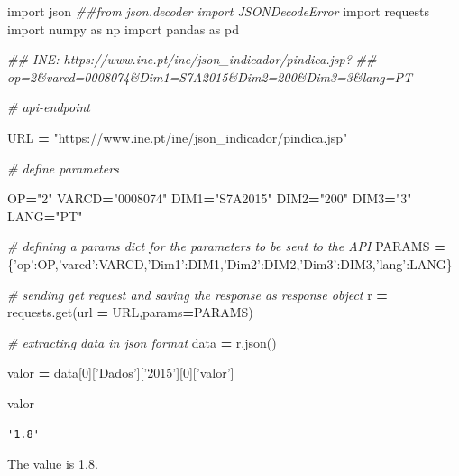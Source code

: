 \documentclass[
  12pt,
]{article}
\newenvironment{Shaded}{\begin{snugshade}}{\end{snugshade}}
\newcommand{\CommentTok}[1]{\textcolor[rgb]{0.56,0.35,0.01}{\textit{#1}}}
\newcommand{\DecValTok}[1]{\textcolor[rgb]{0.00,0.00,0.81}{#1}}
\newcommand{\ImportTok}[1]{#1}
\newcommand{\NormalTok}[1]{#1}
\newcommand{\OperatorTok}[1]{\textcolor[rgb]{0.81,0.36,0.00}{\textbf{#1}}}
\newcommand{\StringTok}[1]{\textcolor[rgb]{0.31,0.60,0.02}{#1}}
\begin{document}
\begin{Shaded}
\begin{Highlighting}[]
\ImportTok{import}\NormalTok{ json}
\CommentTok{##from json.decoder import JSONDecodeError}
\ImportTok{import}\NormalTok{ requests}
\ImportTok{import}\NormalTok{ numpy }\ImportTok{as}\NormalTok{ np}
\ImportTok{import}\NormalTok{ pandas }\ImportTok{as}\NormalTok{ pd}

\CommentTok{## INE: https://www.ine.pt/ine/json_indicador/pindica.jsp?}
\CommentTok{## op=2&varcd=0008074&Dim1=S7A2015&Dim2=200&Dim3=3&lang=PT}

\CommentTok{# api-endpoint }

\NormalTok{URL }\OperatorTok{=} \StringTok{"https://www.ine.pt/ine/json_indicador/pindica.jsp"}
  
\CommentTok{# define parameters}

\NormalTok{OP}\OperatorTok{=}\StringTok{"2"}
\NormalTok{VARCD}\OperatorTok{=}\StringTok{"0008074"}
\NormalTok{DIM1}\OperatorTok{=}\StringTok{"S7A2015"}
\NormalTok{DIM2}\OperatorTok{=}\StringTok{"200"}
\NormalTok{DIM3}\OperatorTok{=}\StringTok{"3"}
\NormalTok{LANG}\OperatorTok{=}\StringTok{"PT"}


\CommentTok{# defining a params dict for the parameters to be sent to the API }
\NormalTok{PARAMS }\OperatorTok{=}\NormalTok{ \{}\StringTok{'op'}\NormalTok{:OP,}\StringTok{'varcd'}\NormalTok{:VARCD,}\StringTok{'Dim1'}\NormalTok{:DIM1,}\StringTok{'Dim2'}\NormalTok{:DIM2,}\StringTok{'Dim3'}\NormalTok{:DIM3,}\StringTok{'lang'}\NormalTok{:LANG\} }
  
\CommentTok{# sending get request and saving the response as response object }
\NormalTok{r }\OperatorTok{=}\NormalTok{ requests.get(url }\OperatorTok{=}\NormalTok{ URL,params}\OperatorTok{=}\NormalTok{PARAMS) }
  
\CommentTok{# extracting data in json format }
\NormalTok{data }\OperatorTok{=}\NormalTok{ r.json() }

\NormalTok{valor }\OperatorTok{=}\NormalTok{ data[}\DecValTok{0}\NormalTok{][}\StringTok{'Dados'}\NormalTok{][}\StringTok{'2015'}\NormalTok{][}\DecValTok{0}\NormalTok{][}\StringTok{'valor'}\NormalTok{]}

\NormalTok{valor}
\end{Highlighting}
\end{Shaded}

\begin{verbatim}
'1.8'
\end{verbatim}

The value is 1.8.
\end{document}

